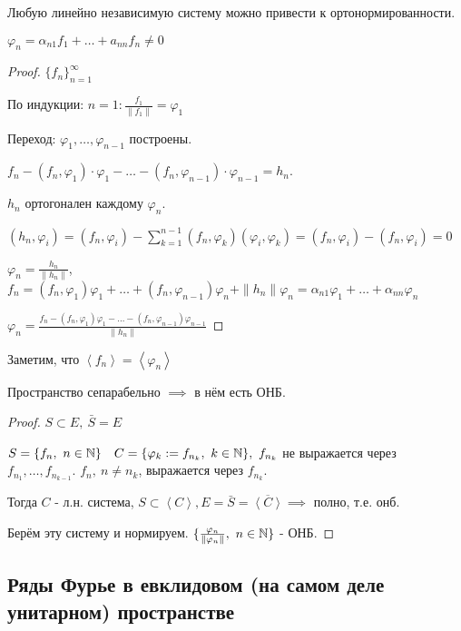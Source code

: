   \begin{theorem}
    Любую линейно независимую систему можно привести к ортонормированности.

    $\varphi_n = \alpha_{n1}f_1 + \dotsc + a_{nn}f_n \neq 0$
  \end{theorem}
  \begin{proof}
    $\{f_n\}^\infty_{n=1}$

    По индукции: $n=1: \frac{f_1}{\|f_1\|} = \varphi_1$

    Переход: $\varphi_1, \dotsc, \varphi_{n-1}$ построены.

    $f_n - (f_n, \varphi_1)\cdot \varphi_1 - \dotsc - (f_n,\varphi_{n-1})\cdot \varphi_{n-1} = h_n$.

    $h_n$ ортогонален каждому $\varphi_n$.

    $(h_n, \varphi_i) = (f_n, \varphi_i) - \sum^{n-1}_{k=1}(f_n,\varphi_k)(\varphi_i, \varphi_k) = (f_n, \varphi_i) - (f_n, \varphi_i) = 0$

    $\varphi_n = \frac{h_n}{\|h_n\|}$, \ $f_n = (f_n, \varphi_1)\varphi_1 + \dotsc + (f_n, \varphi_{n-1})\varphi_n + \|h_n\|\varphi_n = \alpha_{n1}\varphi_1 + \dotsc + \alpha_{nn}\varphi_n$
    
    $\displaystyle\varphi_n = \frac{f_n - (f_n, \varphi_1)\varphi_1 - \dots - (f_n, \varphi_{n-1})\varphi_{n-1}}{\| h_n\| }$ 
  \end{proof}

  Заметим, что $\left\langle f_n\right\rangle  = \left\langle \varphi_n\right\rangle $

  \begin{proposition}
    Пространство сепарабельно $\implies$ в нём есть ОНБ.
  \end{proposition}
  \begin{proof}
    
    $S \subset E, \ \bar S = E$
    
    $S = \{f_n, \ n \in \mathbb{N}\} \quad C = \{\varphi_k := f_{n_k}, \ k \in \mathbb{N}\}, \ f_{n_k}$ не выражается через $f_{n_1}, \dotsc, f_{n_{k-1}}$. $f_n, \ n \neq n_k$, выражается через $f_{n_k}$.
    
    Тогда $C$ - л.н. система, $S \subset \left\langle C \right\rangle, E = \bar S = \overline {\left\langle C \right\rangle} \implies$ полно, т.е. онб.
    
    Берём эту систему и нормируем. $\{\frac{\varphi_n}{\|\varphi_n\|}, \ n \in \mathbb{N}\}$ - ОНБ.
  \end{proof}

  \subsection*{Ряды Фурье в евклидовом (на самом деле унитарном) пространстве}

